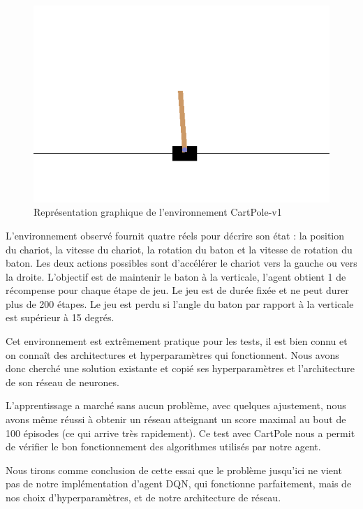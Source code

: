 \begin{figure}
    \centering
    \includegraphics[width=1.0\textwidth]{images/cartpole.png}
    \caption{Représentation graphique de l'environnement CartPole-v1}
    \label{fig:my_label}
\end{figure}

L'environnement observé fournit quatre réels pour décrire son état : la position du chariot, la vitesse du chariot, la rotation du baton et la vitesse de rotation du baton. Les deux actions possibles sont d'accélérer le chariot vers la gauche ou vers la droite. L'objectif est de maintenir le baton à la verticale, l'agent obtient 1 de récompense pour chaque étape de jeu. Le jeu est de durée fixée et ne peut durer plus de 200 étapes. Le jeu est perdu si l'angle du baton par rapport à la verticale est supérieur à 15 degrés.
\par
Cet environnement est extrêmement pratique pour les tests, il est bien connu et on connaît des architectures et hyperparamètres qui fonctionnent. Nous avons donc cherché une solution existante \cite{gsurma_cartpole} et copié ses hyperparamètres et l'architecture de son réseau de neurones.
\par
L'apprentissage a marché sans aucun problème, avec quelques ajustement, nous avons même réussi à obtenir un réseau atteignant un score maximal au bout de 100 épisodes (ce qui arrive très rapidement). Ce test avec CartPole nous a permit de vérifier le bon fonctionnement des algorithmes utilisés par notre agent.
\par
Nous tirons comme conclusion de cette essai que le problème jusqu'ici ne vient pas de notre implémentation d'agent DQN, qui fonctionne parfaitement, mais de nos choix d'hyperparamètres, et de notre architecture de réseau.

